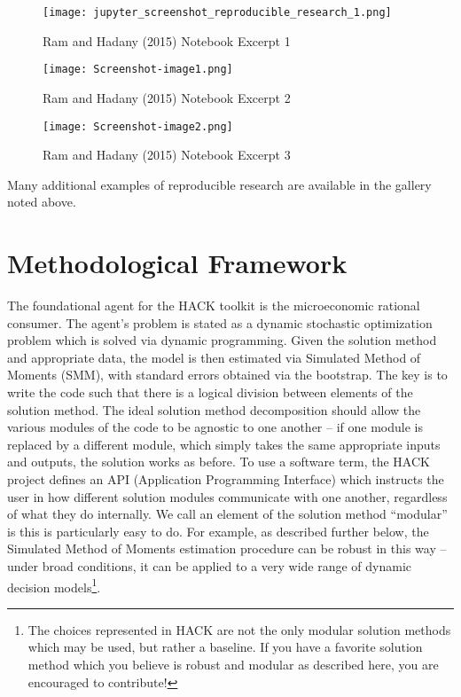\documentclass[]{article}
\begin{document}
\begin{figure}[htbp]
\centering
\texttt{[image: jupyter\_screenshot\_reproducible\_research\_1.png]}
\caption{Ram and Hadany (2015) Notebook Excerpt
1\label{fig:Ram_Hadany_1}}
\end{figure}

\begin{figure}[htbp]
\centering
\texttt{[image: Screenshot-image1.png]}
\caption{Ram and Hadany (2015) Notebook Excerpt
2\label{fig:Ram_Hadany_2}}
\end{figure}

\begin{figure}[htbp]
\centering
\texttt{[image: Screenshot-image2.png]}
\caption{Ram and Hadany (2015) Notebook Excerpt
3\label{fig:Ram_Hadany_3}}
\end{figure}

Many additional examples of reproducible research are available in the
gallery noted above.

\section{Methodological Framework}\label{methodological-framework}

\href{of\%20the\%20HACK\%20Framework}{}

The foundational agent for the HACK toolkit is the microeconomic
rational consumer. The agent's problem is stated as a dynamic stochastic
optimization problem \href{with\%20a\%20unique\%20solution\%20and}{}
which is solved via dynamic programming. Given the solution method and
appropriate data, the model is then estimated via Simulated Method of
Moments (SMM)\href{INSERT\%20REFS\%20HERE!}{}, with standard errors
obtained via the
bootstrap\href{probably\%20need\%20a\%20further\%20reference\%20here,\%20and\%20a\%20subsection\%20or\%20footnote\%20on\%20robustness\%20of\%20the\%20bootstrap}{}.
The key is to write the code such that there is a logical division
between elements of the solution \href{and\%20estimation}{} method. The
ideal solution method decomposition should allow the various modules of
the code to be agnostic to one another -- if one module is replaced by a
different module, which simply takes the same appropriate inputs and
outputs, the solution works as before. To use a software term, the HACK
project defines an API (Application Programming Interface) which
instructs the user in how different solution modules communicate with
one another, regardless of what they do internally. We call an element
of the solution method ``modular'' is this is particularly easy to do.
For example, as described further below, the Simulated Method of Moments
estimation procedure can be robust in this way -- under broad
conditions, it can be applied to a very wide range of dynamic decision
models\footnote{The choices represented in HACK are not the only modular
  solution methods which may be used, but rather a baseline. If you have
  a favorite solution method which you believe is robust and modular as
  described here, you are encouraged to contribute!}.
\end{document}
